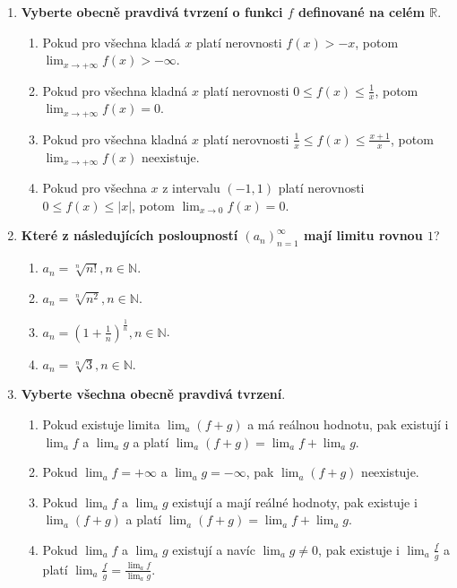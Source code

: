 \documentclass{article}
\begin{document}
\begin{enumerate}
    \pagebreak
    
    \item \textbf{Vyberte obecně pravdivá tvrzení o funkci $f$ definované na celém $\mathbb{R}$}.
    \begin{enumerate}
        \item Pokud pro všechna kladá $x$ platí nerovnosti $f(x) > -x$, potom $\lim_{x \to +\infty}f(x) > -\infty$.
        \item Pokud pro všechna kladná $x$ platí nerovnosti $0 \leq f(x) \leq \frac{1}{x}$, potom $\lim_{x \to +\infty}f(x) = 0$.
        \item Pokud pro všechna kladná $x$ platí nerovnosti $\frac{1}{x} \leq f(x) \leq \frac{x+1}{x}$, potom $\lim_{x \to +\infty}f(x)$ neexistuje.
        \item Pokud pro všechna $x$ z intervalu $(-1,1)$ platí nerovnosti $0 \leq f(x) \leq |x|$, potom $\lim_{x \to 0}f(x) = 0$.
    \end{enumerate}

    \item \textbf{Které z následujících posloupností $(a_n)_{n=1}^\infty$ mají limitu rovnou $1$}?
    \begin{enumerate}
        \item $a_n = \sqrt[n]{n!}, n \in \mathbb{N}$.
        \item $a_n = \sqrt[n]{n^2}, n \in \mathbb{N}$.
        \item $a_n = (1+\frac{1}{n})^{\frac{1}{n}}, n \in \mathbb{N}$.
        \item $a_n = \sqrt[n]{3}, n \in \mathbb{N}$.
    \end{enumerate}

    \item \textbf{Vyberte všechna obecně pravdivá tvrzení}.
    \begin{enumerate}
        \item Pokud existuje limita $\lim_{a}{(f+g)}$ a má reálnou hodnotu, pak existují i $\lim_a f$ a $\lim_a g$ a platí $\lim_a{(f+g)} = \lim_a f + \lim_a g$.
        \item Pokud $\lim_a f = + \infty$ a $\lim_a g = -\infty$, pak $\lim_a{(f+g)}$ neexistuje.
        \item Pokud $\lim_a f$ a $\lim_a g$ existují a mají reálné hodnoty, pak existuje i $\lim_a{(f+g)}$ a platí $\lim_a{(f+g)} = \lim_a f + \lim_a g$.
        \item Pokud $\lim_a f$ a $\lim_a g$ existují a navíc $\lim_a g \neq 0$, pak existuje i $\lim_a \frac{f}{g}$ a platí $\lim_a \frac{f}{g} = \frac{\lim_a f}{\lim_a g}$.
    \end{enumerate}


\end{enumerate}
\end{document}
